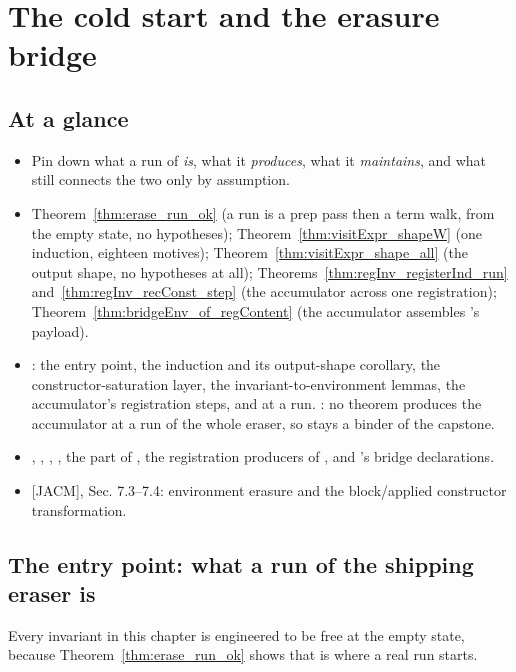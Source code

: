 \chapter{The cold start and the erasure bridge}
\label{chap:coldstart}

\section*{At a glance}
\begin{itemize}
\item {} Pin down what a run of  \emph{is}, what it \emph{produces}, what
it \emph{maintains}, and what still connects the two only by assumption.
\item {} Theorem~\ref{thm:erase_run_ok} (a run is a prep pass then a term walk, from
the empty state, no hypotheses); Theorem~\ref{thm:visitExpr_shapeW} (one induction, eighteen motives);
Theorem~\ref{thm:visitExpr_shape_all} (the output shape, no hypotheses at all);
Theorems~\ref{thm:regInv_registerInd_run} and~\ref{thm:regInv_recConst_step} (the accumulator across
one registration); Theorem~\ref{thm:bridgeEnv_of_regContent} (the accumulator assembles 's
payload).
\item {} \stProved{}: the entry point, the induction and its output-shape corollary, the
constructor-saturation layer, the invariant-to-environment lemmas, the accumulator's registration
steps, and  at a run. \stOpen{}: no theorem produces the accumulator at a run of the whole
eraser, so  stays a binder of the capstone.
\item {} , , ,
, the  part of , the registration producers of
, and 's bridge declarations.
\item {} [JACM], Sec. 7.3--7.4: environment erasure and the block/applied constructor
transformation.
\end{itemize}

\section{The entry point: what a run of the shipping eraser is}
\label{sec:coldstart:entry}

Every invariant in this chapter is engineered to be free at the empty state, because
Theorem~\ref{thm:erase_run_ok} shows that is where a real run starts.

